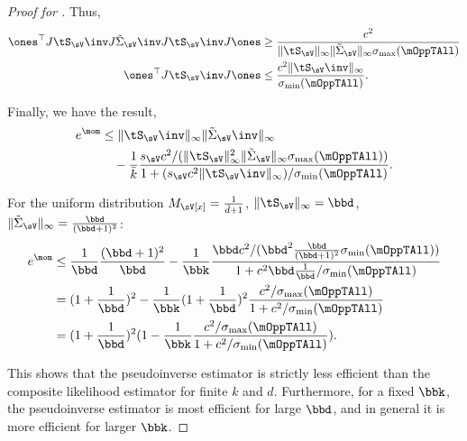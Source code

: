 \begin{proof}[Proof for ]
  Thus,
  \begin{align*}
      \ones^\top J \tS_\sV\inv J \tilde\Sigma_\sV\inv J \tS_\sV\inv J \ones 
      &\ge \frac
          {c^2}
          { \|\tS_\sV\|_{\infty} \|\tilde\Sigma_\sV\|_{\infty}
          \sigma_{\max}(\mOppTAll)} \\
      \ones^\top J \tS_\sV\inv J \ones  
      &\le \frac
          {c^2 \|\tS_\sV\inv\|_{\infty}}
          {\sigma_{\min}(\mOppTAll)}.
  \end{align*}

  Finally, we have the result,
  \begin{align*}
    e^\mom 
    &\le \|\tS_\sV\inv\|_\infty  \|\tilde\Sigma_\sV\inv\|_\infty \\
    &\quad - 
        \frac{1}{\bar k} 
    \frac{
        s_\sV c^2 /(\|\tS_\sV\|^2_{\infty} \|\tilde\Sigma_\sV\|_{\infty}
            \sigma_{\max}(\mOppTAll))
    }
    {1 + (s_\sV c^2 \|\tS_\sV\inv\|_{\infty})/
          \sigma_{\min}(\mOppTAll)
    }.
  \end{align*}

  For the uniform distribution $M_\sV[x] = \frac{1}{\bar d + 1}$,
  $\|\tS_\sV\|_\infty = \bbd$, $\|\tilde
  \Sigma_\sV\|_\infty = \frac{\bbd}{(\bbd + 1)^2}$:
  \begin{align*}
    e^\mom 
    &\le \frac{1}{\bbd} \frac{(\bbd + 1)^2}{\bbd} 
    - \frac{1}{\bbk} \frac{
    \bbd c^2/(\bbd^2 \frac{\bbd}{(\bbd +1)^2} \sigma_{\min}(\mOppTAll))
    }{
    1 + c^2 \bbd \frac{1}{\bbd} / \sigma_{\min}(\mOppTAll)
    } \\
    &= (1 + \frac{1}{\bbd})^2 - \frac{1}{\bbk} (1 + \frac{1}{\bbd})^2 \frac{c^2/\sigma_{\max}(\mOppTAll)}
      {1 + c^2 / \sigma_{\min}(\mOppTAll)} \\
    &= (1 + \frac{1}{\bbd})^2 (1 - \frac{1}{\bbk} \frac{c^2/\sigma_{\max}(\mOppTAll)}{1 + c^2 / \sigma_{\min}(\mOppTAll)}).
  \end{align*}

  This shows that the pseudoinverse estimator is strictly less efficient
  than the composite likelihood estimator for finite $k$ and $d$.
  Furthermore, for a fixed $\bbk$, the pseudoinverse estimator is most
  efficient for large $\bbd$, and in general it is more efficient for
  larger $\bbk$.
\end{proof}

